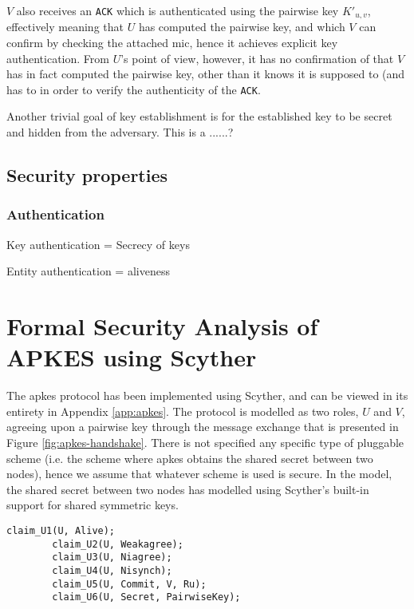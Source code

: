 $V$ also receives an \texttt{ACK} which is authenticated using the pairwise key $K'_{u,v}$, effectively meaning that $U$ has computed the pairwise key, and which $V$ can confirm by checking the attached \gls{mic}, hence it achieves explicit key authentication. From $U$'s point of view, however, it has no confirmation of that $V$ has in fact computed the pairwise key, other than it knows it is supposed to (and has to in order to verify the authenticity of the \texttt{ACK}.

Another trivial goal of key establishment is for the established key to be secret and hidden from the adversary. This is a ......?





\subsection{Security properties}

\subsubsection{Authentication}

Key authentication = Secrecy of keys

Entity authentication = aliveness


\section{Formal Security Analysis of APKES using Scyther}

The \gls{apkes} protocol has been implemented using Scyther, and can be viewed in its entirety in Appendix \ref{app:apkes}. The protocol is modelled as two roles, $U$ and $V$, agreeing upon a pairwise key through the message exchange that is presented in Figure \ref{fig:apkes-handshake}. There is not specified any specific type of pluggable scheme (i.e. the scheme where \gls{apkes} obtains the shared secret between two nodes), hence we assume that whatever scheme is used is secure. In the model, the shared secret between two nodes has modelled using Scyther's built-in support for shared symmetric keys.


\begin{lstlisting}[caption={Security claims for role U in APKES.}, label={lst:claims-u-apkes}]
		claim_U1(U, Alive);
		claim_U2(U, Weakagree);
		claim_U3(U, Niagree);
		claim_U4(U, Nisynch);
		claim_U5(U, Commit, V, Ru);
		claim_U6(U, Secret, PairwiseKey);
\end{lstlisting}

